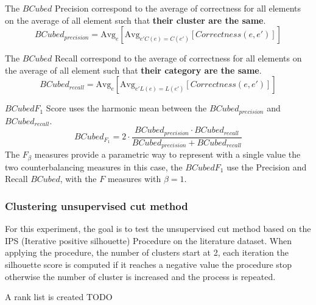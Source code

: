 \begin{definition}
  The $BCubed$ Precision correspond to the average of correctness for all elements on the average of all element such that \textbf{their cluster are the same}.
  \begin{equation}
    BCubed_{precision} = \text{Avg}_{e}[\text{Avg}_{e' C(e)=C(e')}[Correctness(e, e')]]
  \end{equation}
\end{definition}

\begin{definition}
  The $BCubed$ Recall correspond to the average of correctness for all elements on the average of all element such that \textbf{their category are the same}.
  \begin{equation}
    BCubed_{recall} = \text{Avg}_{e}[\text{Avg}_{e' L(e)=L(e')}[Correctness(e, e')]]
  \end{equation}
\end{definition}

\begin{definition}
  $BCubed F_1$ Score uses the harmonic mean between the $BCubed_{precision}$ and $BCubed_{recall}$.
  \begin{equation}
    BCubed_{F_1} =
    2 \cdot \frac{BCubed_{precision} \cdot BCubed_{recall}}
    {BCubed_{precision} + BCubed_{recall}}
  \end{equation}
  The $F_\beta$ measures provide a parametric way to represent with a single value the two counterbalancing measures in this case, the $BCubed F_1$ use the Precision and Recall $BCubed$, with the $F$ measures with $\beta = 1$.
\end{definition}

\subsubsection{Clustering unsupervised cut method}

For this experiment, the goal is to test the unsupervised cut method based on the IPS (Iterative positive silhouette) Procedure on the literature dataset.
When applying the procedure, the number of clusters start at 2, each iteration the silhouette score is computed if it reaches a negative value the procedure stop otherwise the number of cluster is increased and the process is repeated.

A rank list is created{\color{red} TODO}

